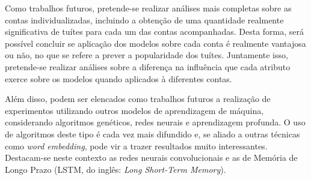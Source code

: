 \documentclass[oneside,openright,12pt]{ufsm_2015} %
\begin{document}
    \par Como trabalhos futuros, pretende-se realizar análises mais completas sobre as contas individualizadas, incluindo a obtenção de uma quantidade realmente significativa de tuítes para cada um das contas acompanhadas. Desta forma, será possível concluir se aplicação dos modelos sobre cada conta é realmente vantajosa ou não, no que se refere a prever a popularidade dos tuítes. Juntamente isso, pretende-se realizar análises sobre a diferença na influência que cada atributo exerce sobre os modelos quando aplicados à diferentes contas.
    
    \par Além disso, podem ser elencados como trabalhos futuros a realização de experimentos utilizando outros modelos de aprendizagem de máquina, considerando algoritmos genéticos, redes neurais e aprendizagem profunda. O uso de algoritmos deste tipo é cada vez mais difundido e, se aliado a outras técnicas como \textit{word embedding}, pode vir a trazer resultados muito interessantes. Destacam-se neste contexto as redes neurais convolucionais e as de Memória de Longo Prazo (LSTM, do inglês: \textit{Long Short-Term Memory}).




	
\apendice %

        
\anexo    %

\end{document}
